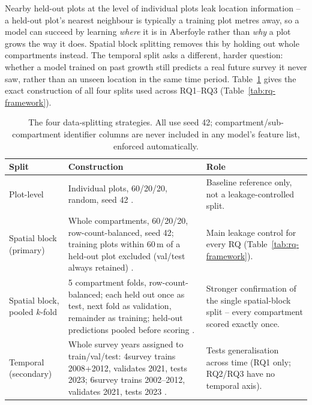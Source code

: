 \documentclass[11pt,a4paper]{report}
\begin{document}
Nearby held-out plots at the level of individual plots leak location information -- a held-out plot's nearest neighbour is typically a training plot metres away, so a model can succeed by learning \emph{where} it is in Aberfoyle rather than \emph{why} a plot grows the way it does. Spatial block splitting removes this by holding out whole compartments instead. The temporal split asks a different, harder question: whether a model trained on past growth still predicts a real future survey it never saw, rather than an unseen location in the same time period. Table~\ref{tab:splits-summary} gives the exact construction of all four splits used across RQ1--RQ3 (Table~\ref{tab:rq-framework}).

\begin{table}[!htbp]
\centering
\scriptsize
\renewcommand{\arraystretch}{1.2}
\begin{tabular}{p{2.1cm}p{5.1cm}p{5.3cm}}
\toprule
Split & Construction & Role \\
\midrule
Plot-level & Individual plots, 60/20/20, random, seed 42 \ct{source that uses plot-level split}. & Baseline reference only, not a leakage-controlled split. \\
Spatial block (primary) & Whole compartments, 60/20/20, row-count-balanced, seed 42; training plots within 60\,m of a held-out plot excluded (val/test always retained) \citep{roberts2017Cross_C5_EVAL}. & Main leakage control for every RQ (Table~\ref{tab:rq-framework}). \\
Spatial block, pooled $k$-fold & 5 compartment folds, row-count-balanced; each held out once as test, next fold as validation, remainder as training; held-out predictions pooled before scoring \citep{ploton2020Spatial_C5_EVAL}. & Stronger confirmation of the single spatial-block split -- every compartment scored exactly once. \\
Temporal (secondary) & Whole survey years assigned to train/val/test: 4survey trains 2008+2012, validates 2021, tests 2023; 6survey trains 2002--2012, validates 2021, tests 2023 \citep{lynch2025Digital_C4_NN}. & Tests generalisation across time (RQ1 only; RQ2/RQ3 have no temporal axis). \\
\bottomrule
\end{tabular}
\caption{The four data-splitting strategies. All use seed 42; compartment/sub-compartment
identifier columns are never included in any model's feature list, enforced automatically.}
\label{tab:splits-summary}
\end{table}
\end{document}
